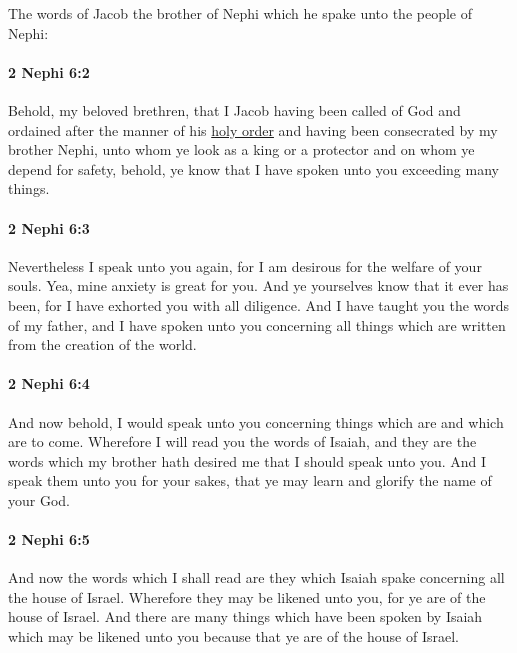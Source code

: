 			The words of Jacob the brother of Nephi
			which he spake unto the people of Nephi:

		\paragraph{2 Nephi 6:2} %
			\label{2NEPHI-6-2}

			Behold, my beloved brethren,
			that I Jacob having been called of God
			and ordained after the manner of his \hyperref[ORDER-PHRASES]{holy order}
			and having been consecrated by my brother Nephi,
			unto whom ye look as a king or a protector
			and on whom ye depend for safety,
			behold, ye know that I have spoken unto you exceeding many things.

		\paragraph{2 Nephi 6:3} %
			\label{2NEPHI-6-3}

			Nevertheless I speak unto you again,
			for I am desirous for the welfare of your souls.
			Yea, mine anxiety is great for you.
			And ye yourselves know that it ever has been,
			for I have exhorted you with all diligence.
			And I have taught you the words of my father,
			and I have spoken unto you concerning all things
			which are written from the creation of the world.

		\paragraph{2 Nephi 6:4} %
			\label{2NEPHI-6-4}

			And now behold, I would speak unto you
			concerning things which are and which are to come.
			Wherefore I will read you the words of Isaiah,
			and they are the words which my brother hath desired me
			that I should speak unto you.
			And I speak them unto you for your sakes,
			that ye may learn and glorify the name of your God.

		\paragraph{2 Nephi 6:5} %
			\label{2NEPHI-6-5}

			And now the words which I shall read are they
			which Isaiah spake concerning all the house of Israel.
			Wherefore they may be likened unto you,
			for ye are of the house of Israel.
			And there are many things which have been spoken by Isaiah
			which may be likened unto you
			because that ye are of the house of Israel.

